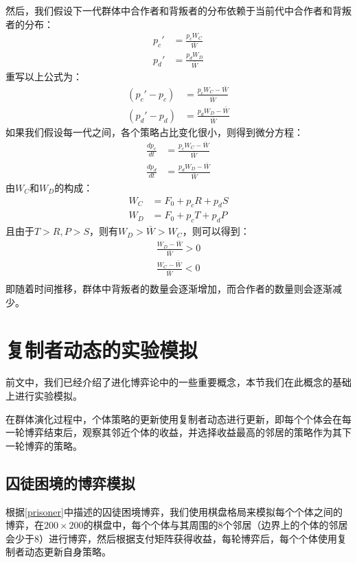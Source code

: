 \documentclass[twocolumn]{article}
\begin{document}
    然后，我们假设下一代群体中合作者和背叛者的分布依赖于当前代中合作者和背叛者的分布：
    \begin{equation}
        \begin{split}
            p_c'&=\frac{p_cW_C}{\bar W}\\
            p_d'&=\frac{p_dW_D}{\bar W}
        \end{split}
    \end{equation}
    重写以上公式为：
    \begin{equation}
        \begin{split}
            (p_c'-p_c)&=\frac{p_cW_C-\bar W}{\bar W}\\
            (p_d'-p_d)&=\frac{p_dW_D-\bar W}{\bar W}
        \end{split}
    \end{equation}
    如果我们假设每一代之间，各个策略占比变化很小，则得到微分方程：
    \begin{equation}
        \begin{split}
            \frac{dp_c}{dt}&=\frac{p_cW_C-\bar W}{\bar W}\\
            \frac{dp_d}{dt}&=\frac{p_dW_D-\bar W}{\bar W}
        \end{split}
    \end{equation}
    由$W_C$和$W_D$的构成：
    \begin{equation}
        \begin{split}
            W_C&=F_0+p_cR+p_dS\\
            W_D&=F_0+p_cT+p_dP
        \end{split}
    \end{equation}
    且由于$T>R, P>S$，则有$W_D>\bar W>W_C$，则可以得到：
    \begin{equation}
        \begin{split}
            \frac{W_D-\bar W}{\bar W}>0\\
            \frac{W_C-\bar W}{\bar W}<0\\
        \end{split}
    \end{equation}
    即随着时间推移，群体中背叛者的数量会逐渐增加，而合作者的数量则会逐渐减少。

    \section{复制者动态的实验模拟}
    前文中，我们已经介绍了进化博弈论中的一些重要概念，本节我们在此概念的基础上进行实验模拟。

    在群体演化过程中，个体策略的更新使用复制者动态进行更新，即每个个体会在每一轮博弈结束后，观察其邻近个体的收益，并选择收益最高的邻居的策略作为其下一轮博弈的策略。

    \subsection{囚徒困境的博弈模拟}
    根据\ref{prisoner}中描述的囚徒困境博弈，我们使用棋盘格局来模拟每个个体之间的博弈，在$200\times 200$的棋盘中，每个个体与其周围的8个邻居（边界上的个体的邻居会少于8）进行博弈，然后根据支付矩阵获得收益，每轮博弈后，每个个体使用复制者动态更新自身策略。

    
\end{document}

